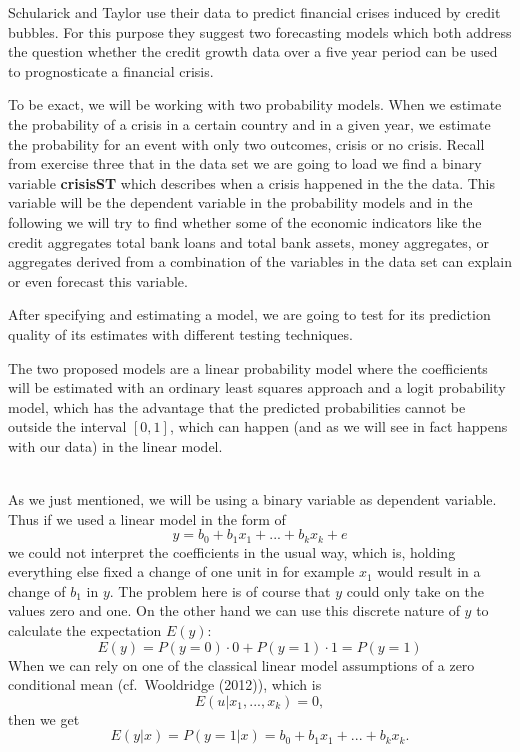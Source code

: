 \documentclass[a4paper,11pt,abstract=on]{scrartcl}
\newcommand{\infobox}[2]{\begin{mdframed}[linewidth=0.8pt, innerleftmargin = 0.8cm, innerrightmargin = 0.8cm, innertopmargin = 0.8cm, innerbottommargin = 0.8cm,skipabove=0.5cm,skipbelow=1.5cm]{
\sf{\textbf{#1} }\\  #2 
}\end{mdframed}}
\begin{document}
{Schularick and Taylor use their data to predict financial crises induced
by credit bubbles. For this purpose they suggest two forecasting models
which both address the question whether the credit growth data over a
five year period can be used to prognosticate a financial crisis.

To be exact, we will be working with two probability models. When we
estimate the probability of a crisis in a certain country and in a given
year, we estimate the probability for an event with only two outcomes,
crisis or no crisis. Recall from exercise three that in the data set we
are going to load we find a binary variable \textbf{crisisST} which
describes when a crisis happened in the the data. This variable will be
the dependent variable in the probability models and in the following we
will try to find whether some of the economic indicators like the credit
aggregates total bank loans and total bank assets, money aggregates, or
aggregates derived from a combination of the variables in the data set
can explain or even forecast this variable.

After specifying and estimating a model, we are going to test for its
prediction quality of its estimates with different testing techniques.

The two proposed models are a linear probability model where the
coefficients will be estimated with an ordinary least squares approach
and a logit probability model, which has the advantage that the
predicted probabilities cannot be outside the interval $[0,1]$, which
can happen (and as we will see in fact happens with our data) in the
linear model.

\infobox{Info: Linear probability models}{

As we just mentioned, we will be using a binary variable as dependent
variable. Thus if we used a linear model in the form of
\[y = b_0 + b_1 x_1 + ... + b_k x_k + e\] we could not interpret the
coefficients in the usual way, which is, holding everything else fixed a
change of one unit in for example $x_1$ would result in a change of
$b_1$ in $y$. The problem here is of course that $y$ could only take on
the values zero and one. On the other hand we can use this discrete
nature of $y$ to calculate the expectation $E(y)$:
\[E(y) = P(y = 0) \cdot 0 + P(y=1) \cdot 1 = P(y=1)\] When we can rely
on one of the classical linear model assumptions of a zero conditional
mean (cf.~Wooldridge (2012)), which is \[E(u | x_1,...,x_k) = 0,\] then
we get \[E(y | x) = P(y=1|x) = b_0 + b_1 x_1 + ... + b_k x_k.\]

}}
\end{document}
